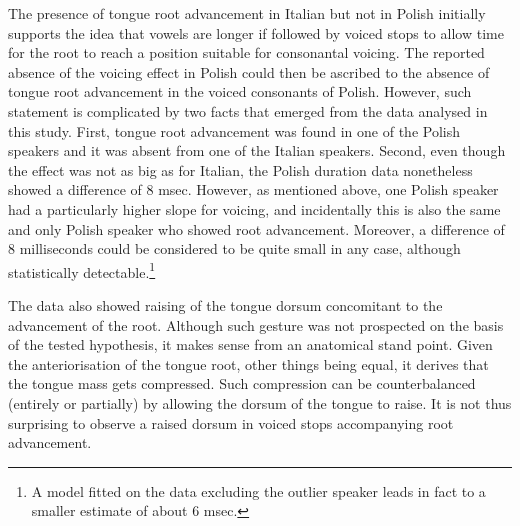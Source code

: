 \documentclass[authoryear, twocolumn]{elsarticle}
\begin{document}
The presence of tongue root advancement in Italian but not in Polish
initially supports the idea that vowels are longer if followed by voiced
stops to allow time for the root to reach a position suitable for
consonantal voicing. The reported absence of the voicing effect in
Polish could then be ascribed to the absence of tongue root advancement
in the voiced consonants of Polish. However, such statement is
complicated by two facts that emerged from the data analysed in this
study. First, tongue root advancement was found in one of the Polish
speakers and it was absent from one of the Italian speakers. Second,
even though the effect was not as big as for Italian, the Polish
duration data nonetheless showed a difference of 8 msec. However, as
mentioned above, one Polish speaker had a particularly higher slope for
voicing, and incidentally this is also the same and only Polish speaker
who showed root advancement. Moreover, a difference of 8 milliseconds
could be considered to be quite small in any case, although
statistically
detectable.\footnote{A model fitted on the data excluding the outlier speaker leads in fact to a smaller estimate of about 6 msec.}

The data also showed raising of the tongue dorsum concomitant to the
advancement of the root. Although such gesture was not prospected on the
basis of the tested hypothesis, it makes sense from an anatomical stand
point. Given the anteriorisation of the tongue root, other things being
equal, it derives that the tongue mass gets compressed. Such compression
can be counterbalanced (entirely or partially) by allowing the dorsum of
the tongue to raise. It is not thus surprising to observe a raised
dorsum in voiced stops accompanying root advancement.


\end{document}
